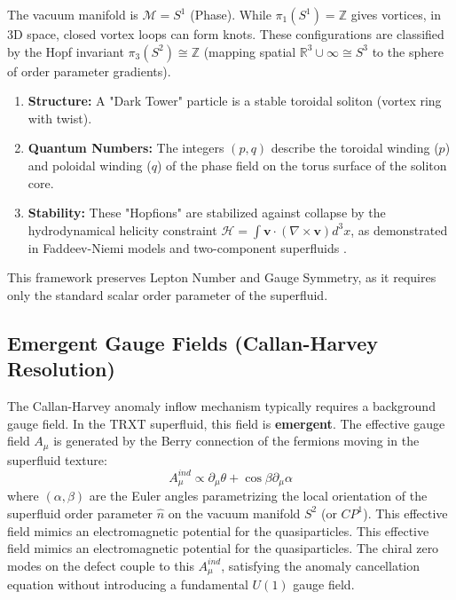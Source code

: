 \documentclass[a4paper,12pt]{article}
\begin{document}
The vacuum manifold is $\mathcal{M} = S^1$ (Phase). While $\pi_1(S^1) = \mathbb{Z}$ gives vortices, in 3D space, closed vortex loops can form knots. These configurations are classified by the Hopf invariant $\pi_3(S^2) \cong \mathbb{Z}$ (mapping spatial $\mathbb{R}^3 \cup \infty \cong S^3$ to the sphere of order parameter gradients).
\begin{enumerate}
    \item \textbf{Structure:} A "Dark Tower" particle is a stable toroidal soliton (vortex ring with twist).
    \item \textbf{Quantum Numbers:} The integers $(p,q)$ describe the toroidal winding ($p$) and poloidal winding ($q$) of the phase field on the torus surface of the soliton core.
    \item \textbf{Stability:} These "Hopfions" are stabilized against collapse by the hydrodynamical helicity constraint $\mathcal{H} = \int \mathbf{v} \cdot (\nabla \times \mathbf{v}) d^3x$, as demonstrated in Faddeev-Niemi models and two-component superfluids \cite{faddeev,babaev,battye1998,manton2004}.
\end{enumerate}
This framework preserves Lepton Number and Gauge Symmetry, as it requires only the standard scalar order parameter of the superfluid.

\subsection{Emergent Gauge Fields (Callan-Harvey Resolution)}
The Callan-Harvey anomaly inflow mechanism typically requires a background gauge field. In the TRXT superfluid, this field is \textbf{emergent}.
The effective gauge field $A_\mu$ is generated by the Berry connection of the fermions moving in the superfluid texture:
\begin{equation}
    A_\mu^{ind} \propto \partial_\mu \theta + \cos \beta \partial_\mu \alpha
\end{equation}
where $(\alpha, \beta)$ are the Euler angles parametrizing the local orientation of the superfluid order parameter $\hat{n}$ on the vacuum manifold $S^2$ (or $CP^1$). This effective field mimics an electromagnetic potential for the quasiparticles.
This effective field mimics an electromagnetic potential for the quasiparticles. The chiral zero modes on the defect couple to this $A_\mu^{ind}$, satisfying the anomaly cancellation equation without introducing a fundamental $U(1)$ gauge field.

\newpage
\end{document}
